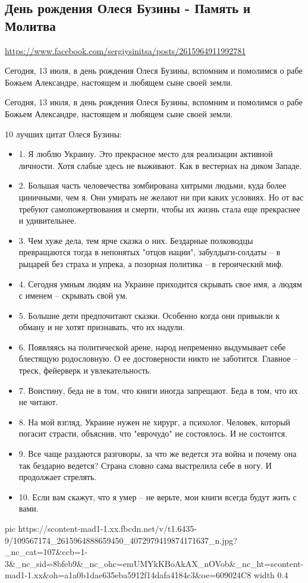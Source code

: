  
 
 
 
 
\subsection{День рождения Олеся Бузины - Память и Молитва}
\url{https://www.facebook.com/sergiysinitsa/posts/2615964911992781}

Сегодня, 13 июля, в день рождения Олеся Бузины, вспомним и помолимся о рабе Божьем Александре, настоящем и любящем сыне своей земли. 


Сегодня, 13 июля, в день рождения Олеся Бузины, вспомним и помолимся о рабе Божьем Александре, настоящем и любящем сыне своей земли. 

10 лучших цитат Олеся Бузины:

\begin{itemize}
  \item 1. Я люблю Украину. Это прекрасное место для реализации активной личности. Хотя слабые здесь не выживают. Как в вестернах на диком Западе.
  \item 2. Большая часть человечества зомбирована хитрыми людьми, куда более циничными, чем я. Они умирать не желают ни при каких условиях. Но от вас требуют самопожертвования и смерти, чтобы их жизнь стала еще прекраснее и удивительнее. 
  \item 3. Чем хуже дела, тем ярче сказка о них. Бездарные полководцы превращаются тогда в непонятых "отцов нации", забулдыги-солдаты – в рыцарей без страха и упрека, а позорная политика – в героический миф. 
  \item 4. Сегодня умным людям на Украине приходится скрывать свое имя, а людям с именем – скрывать свой ум.
  \item 5. Большие дети предпочитают сказки. Особенно когда они привыкли к обману и не хотят признавать, что их надули.
  \item 6. Появляясь на политической арене, народ непременно выдумывает себе блестящую родословную. О ее достоверности никто не заботится. Главное – треск, фейерверк и увлекательность. 
  \item 7. Воистину, беда не в том, что книги иногда запрещают. Беда в том, что их не читают. 
  \item 8. На мой взгляд, Украине нужен не хирург, а психолог. Человек, который погасит страсти, объяснив, что "еврочудо" не состоялось. И не состоится.
  \item 9. Все чаще раздаются разговоры, за что же ведется эта война и почему она так бездарно ведется? Страна словно сама выстрелила себе в ногу. И продолжает стрелять.
  \item 10. Если вам скажут, что я умер – не верьте, мои книги всегда будут жить с вами.
\end{itemize}

\ifcmt
  pic https://scontent-mad1-1.xx.fbcdn.net/v/t1.6435-9/109567174_2615964888659450_4072979419874171637_n.jpg?_nc_cat=107&ccb=1-3&_nc_sid=8bfeb9&_nc_ohc=emUMYkKBoAkAX_nOVob&_nc_ht=scontent-mad1-1.xx&oh=a1a0b1dae635eba5912f14dafa4184c3&oe=609024C8
  width 0.4
\fi

